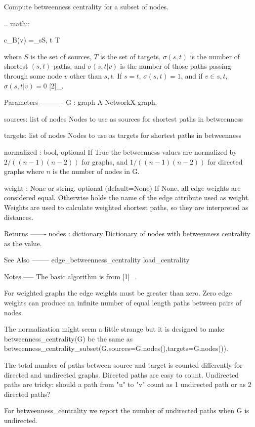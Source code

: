\begin{DoxyVerb}Compute betweenness centrality for a subset of nodes.

.. math::

   c_B(v) =\sum_{s\in S, t \in T} 

where $S$ is the set of sources, $T$ is the set of targets,
$\sigma(s, t)$ is the number of shortest $(s, t)$-paths,
and $\sigma(s, t|v)$ is the number of those paths
passing through some  node $v$ other than $s, t$.
If $s = t$, $\sigma(s, t) = 1$,
and if $v \in {s, t}$, $\sigma(s, t|v) = 0$ [2]_.


Parameters
----------
G : graph
  A NetworkX graph.

sources: list of nodes
  Nodes to use as sources for shortest paths in betweenness

targets: list of nodes
  Nodes to use as targets for shortest paths in betweenness

normalized : bool, optional
  If True the betweenness values are normalized by $2/((n-1)(n-2))$
  for graphs, and $1/((n-1)(n-2))$ for directed graphs where $n$
  is the number of nodes in G.

weight : None or string, optional (default=None)
  If None, all edge weights are considered equal.
  Otherwise holds the name of the edge attribute used as weight.
  Weights are used to calculate weighted shortest paths, so they are
  interpreted as distances.

Returns
-------
nodes : dictionary
   Dictionary of nodes with betweenness centrality as the value.

See Also
--------
edge_betweenness_centrality
load_centrality

Notes
-----
The basic algorithm is from [1]_.

For weighted graphs the edge weights must be greater than zero.
Zero edge weights can produce an infinite number of equal length
paths between pairs of nodes.

The normalization might seem a little strange but it is
designed to make betweenness_centrality(G) be the same as
betweenness_centrality_subset(G,sources=G.nodes(),targets=G.nodes()).

The total number of paths between source and target is counted
differently for directed and undirected graphs. Directed paths
are easy to count. Undirected paths are tricky: should a path
from "u" to "v" count as 1 undirected path or as 2 directed paths?

For betweenness_centrality we report the number of undirected
paths when G is undirected.


\end{DoxyVerb}
